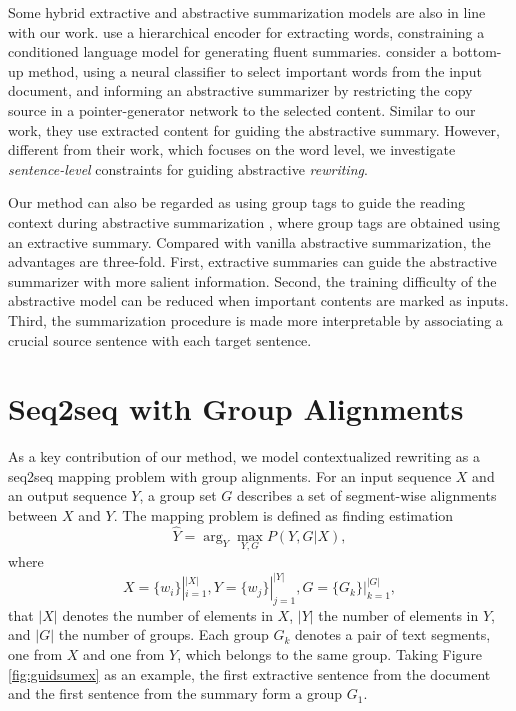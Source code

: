 \documentclass[letterpaper]{article} %
\begin{document}
Some hybrid extractive and abstractive summarization models are also in line with our work. \citet{Cheng2016} use a hierarchical encoder for extracting words, constraining a conditioned language model for generating fluent summaries. \citet{Gehrmann2019} consider a bottom-up method, using a neural classifier to select important words from the input document, and informing an abstractive summarizer by restricting the copy source in a pointer-generator network to the selected content. Similar to our work, they use extracted content for guiding the abstractive summary. However, different from their work, which focuses on the word level, we investigate {\it sentence-level} constraints for guiding abstractive {\it rewriting}.

Our method can also be regarded as using group tags to guide the reading context during abstractive summarization \cite{Rush2015,Nallapati2016,See2017}, where group tags are obtained using an extractive summary. Compared with vanilla abstractive summarization, the advantages are three-fold. First, extractive summaries can guide the abstractive summarizer with more salient information. Second, the training difficulty of the abstractive model can be reduced when important contents are marked as inputs. Third, the summarization procedure is made more interpretable by associating a crucial source sentence with each target sentence.

\section{Seq2seq with Group Alignments}
As a key contribution of our method, we model contextualized rewriting as a seq2seq mapping problem with group alignments.
For an input sequence $X$ and an output sequence $Y$, a group set $G$ describes a set of segment-wise alignments between $X$ and $Y$. The mapping problem is defined as finding estimation
\begin{equation}
  \hat{Y} = \arg_Y \max_{Y,G} P(Y,G|X),
\label{eq:seq2seq:def1}
\end{equation}
where
\begin{equation}
  X =\{w_i\}|_{i=1}^{|X|}, 
  Y =\{w_j\}|_{j=1}^{|Y|},
  G =\{G_k\}|_{k=1}^{|G|},
\end{equation}
that $|X|$ denotes the number of elements in $X$, $|Y|$ the number of elements in $Y$, and $|G|$ the number of groups. Each group $G_k$ denotes a pair of text segments, one from $X$ and one from $Y$, which belongs to the same group. Taking Figure \ref{fig:guidsumex} as an example, the first extractive sentence from the document and the first sentence from the summary form a group $G_1$.
\end{document}
